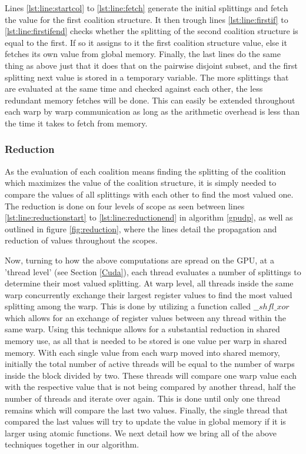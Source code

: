 \documentclass{llncs}
\begin{document}
Lines \ref{lst:line:startcol} to \ref{lst:line:fetch} generate
the initial splittings and fetch the value for the first coalition structure. It then trough lines \ref{lst:line:firstif} to \ref{lst:line:firstifend}
checks whether the splitting of the second coalition structure is equal to the first. 
If so it assigns to it the first coalition structure value, else it fetches its own value from global memory. 
Finally, the last lines do the same thing as above just that it does that on the pairwise disjoint subset, 
and the first splitting next value is stored in a temporary variable. 
The more splittings that are evaluated at the same time and checked against each other, the less redundant memory fetches will be done. This can easily be extended throughout each warp by warp communication as long as the arithmetic overhead is less than the time it takes to fetch from memory. 


\subsubsection{Reduction} \label{reduction} %
As the evaluation of each coalition  means finding the splitting  of the coalition  which maximizes the value of the coalition structure, it is simply needed to compare the values of all splittings with each other to find the most valued one.  The reduction is done on four levels of scope as seen between lines \ref{lst:line:reductionstart} to \ref{lst:line:reductionend} in algorithm \ref{gpudp},
as well as outlined in figure \ref{fig:reduction}, where the lines detail the propagation and reduction of values throughout the scopes.

Now, turning to how the above computations are spread on the GPU, at a 'thread level' (see Section \ref{Cuda}), each thread evaluates a number of splittings to determine their most valued splitting.  At warp level, all threads inside the same warp concurrently exchange their largest register values to find the most valued splitting among the warp. This is done by utilizing a function called $\_\_shfl\_xor$ which allows for an exchange of register values between any thread within the same warp.
Using this technique allows for a substantial reduction in shared memory use, as all that is needed to be stored is one value per warp in shared memory.  With each single value from each warp moved into shared memory, initially the total number of active threads will be equal to the number
of warps inside the block divided by two. These threads will compare one warp value each with the respective value that is not being compared by another thread, half the number of threads and iterate over again. This is done until only one thread remains which will compare the last two values.
Finally, the single thread that compared the last values will try to update the value in global memory if it is larger using atomic functions. We next detail how we bring all of the above techniques together in our algorithm.
\end{document}
